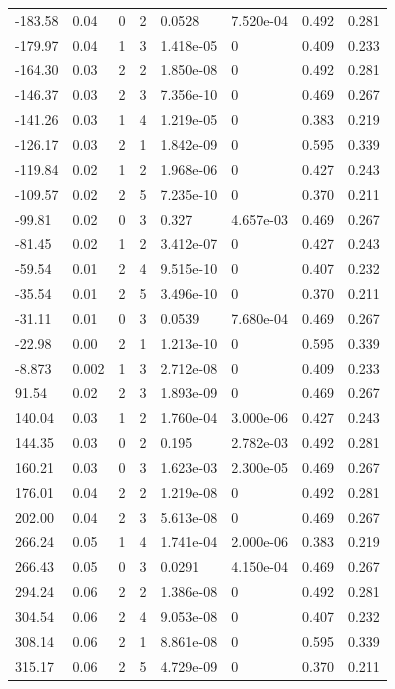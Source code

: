 \documentclass[preview]{standalone}
\begin{document}
{{\begin{tabular}{L{1.2cm}C{1.2cm} C{0.3cm}C{0.5cm} C{1.4cm}C{1.4cm} C{1.4cm}C{1.4cm}}
  -183.58  &  0.04  & 0     &  2 &  0.0528  & 7.520e-04  & 0.492 &  0.281   \\ 
  -179.97  &  0.04  & 1     &  3 &  1.418e-05  & 0  & 0.409 &  0.233   \\ 
  -164.30  &  0.03  & 2     &  2 &  1.850e-08  & 0  & 0.492 &  0.281   \\ 
  -146.37  &  0.03  & 2     &  3 &  7.356e-10  & 0  & 0.469 &  0.267   \\ 
  -141.26  &  0.03  & 1     &  4 &  1.219e-05  & 0  & 0.383 &  0.219   \\ 
  -126.17  &  0.03  & 2     &  1 &  1.842e-09  & 0  & 0.595 &  0.339   \\ 
  -119.84  &  0.02  & 1     &  2 &  1.968e-06  & 0  & 0.427 &  0.243   \\ 
  -109.57  &  0.02  & 2     &  5 &  7.235e-10  & 0  & 0.370 &  0.211   \\ 
  -99.81  &  0.02  & 0     &  3 &  0.327  & 4.657e-03  & 0.469 &  0.267   \\ 
  -81.45  &  0.02  & 1     &  2 &  3.412e-07  & 0  & 0.427 &  0.243   \\ 
  -59.54  &  0.01  & 2     &  4 &  9.515e-10  & 0  & 0.407 &  0.232   \\ 
  -35.54  &  0.01  & 2     &  5 &  3.496e-10  & 0  & 0.370 &  0.211   \\ 
  -31.11  &  0.01  & 0     &  3 &  0.0539  & 7.680e-04  & 0.469 &  0.267   \\ 
  -22.98  &  0.00  & 2     &  1 &  1.213e-10  & 0  & 0.595 &  0.339   \\ 
  -8.873  &  0.002  & 1     &  3 &  2.712e-08  & 0  & 0.409 &  0.233   \\ 
  91.54  &  0.02  & 2     &  3 &  1.893e-09  & 0  & 0.469 &  0.267   \\ 
  140.04  &  0.03  & 1     &  2 &  1.760e-04  & 3.000e-06  & 0.427 &  0.243   \\ 
  144.35  &  0.03  & 0     &  2 &  0.195  & 2.782e-03  & 0.492 &  0.281   \\ 
  160.21  &  0.03  & 0     &  3 &  1.623e-03  & 2.300e-05  & 0.469 &  0.267   \\ 
  176.01  &  0.04  & 2     &  2 &  1.219e-08  & 0  & 0.492 &  0.281   \\ 
  202.00  &  0.04  & 2     &  3 &  5.613e-08  & 0  & 0.469 &  0.267   \\ 
  266.24  &  0.05  & 1     &  4 &  1.741e-04  & 2.000e-06  & 0.383 &  0.219   \\ 
  266.43  &  0.05  & 0     &  3 &  0.0291  & 4.150e-04  & 0.469 &  0.267   \\ 
  294.24  &  0.06  & 2     &  2 &  1.386e-08  & 0  & 0.492 &  0.281   \\ 
  304.54  &  0.06  & 2     &  4 &  9.053e-08  & 0  & 0.407 &  0.232   \\ 
  308.14  &  0.06  & 2     &  1 &  8.861e-08  & 0  & 0.595 &  0.339   \\ 
  315.17  &  0.06  & 2     &  5 &  4.729e-09  & 0  & 0.370 &  0.211   \\ 
\hline 
\end{tabular} 

}}
\end{document}
